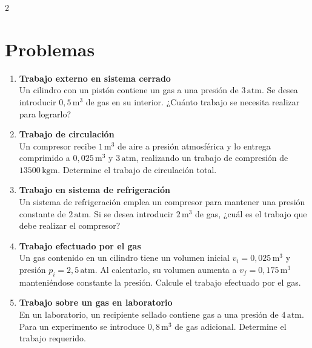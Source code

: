 \documentclass[a4paper,12pt]{article}
\begin{document}
\begin{multicols}{2}
\section*{Problemas}
\begin{enumerate}

\item \textbf{Trabajo externo en sistema cerrado} \\
Un cilindro con un pistón contiene un gas a una presión de $3\,\text{atm}$. Se desea introducir $0{,}5\,\text{m}^3$ de gas en su interior. ¿Cuánto trabajo se necesita realizar para lograrlo?

\vspace{0.3cm}

\item \textbf{Trabajo de circulación} \\
Un compresor recibe $1\,\text{m}^3$ de aire a presión atmosférica y lo entrega comprimido a $0{,}025\,\text{m}^3$ y $3\,\text{atm}$, realizando un trabajo de compresión de $13500\,\text{kgm}$. Determine el trabajo de circulación total.



\vspace{0.3cm}

\item \textbf{Trabajo en sistema de refrigeración} \\
Un sistema de refrigeración emplea un compresor para mantener una presión constante de $2\,\text{atm}$. Si se desea introducir $2\,\text{m}^3$ de gas, ¿cuál es el trabajo que debe realizar el compresor?

\vspace{0.3cm}

\item \textbf{Trabajo efectuado por el gas} \\
Un gas contenido en un cilindro tiene un volumen inicial $v_i = 0{,}025\,\text{m}^3$ y presión $p_i = 2{,}5\,\text{atm}$. Al calentarlo, su volumen aumenta a $v_f = 0{,}175\,\text{m}^3$ manteniéndose constante la presión. Calcule el trabajo efectuado por el gas.

\vspace{0.3cm}

\item \textbf{Trabajo sobre un gas en laboratorio} \\
En un laboratorio, un recipiente sellado contiene gas a una presión de $4\,\text{atm}$. Para un experimento se introduce $0{,}8\,\text{m}^3$ de gas adicional. Determine el trabajo requerido.

\end{enumerate}
\end{multicols}
\end{document}
